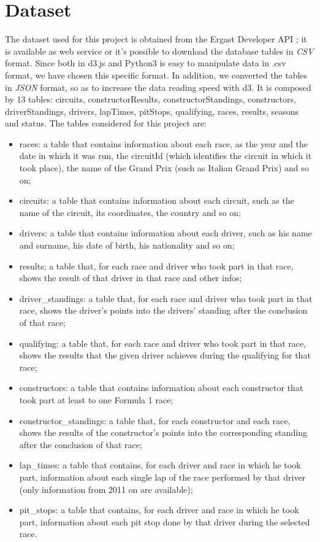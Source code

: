 \documentclass[11pt,twocolumn,letterpaper]{article}
\begin{document}
\section{Dataset}
The dataset used for this project is obtained from the Ergast Developer API \cite{Dataset}; it is available as web service or it's possible to download the database tables in \textit{CSV} format. Since both in d3.js \cite{D3} and Python3 is easy to manipulate data in .csv format, we have chosen this specific format. In addition, we converted the tables in \textit{JSON} format, so as to increase the data reading speed with d3. It is composed by 13 tables: circuits, constructorResults, constructorStandings, constructors, driverStandings, drivers, lapTimes, pitStops, qualifying, races, results, seasons and status. The tables considered for this project are:
\begin{itemize}
	\item races: a table that contains information about each race, as the year and the date in which it was run, the circuitId (which identifies the circuit in which it took place), the name of the Grand Prix (such as Italian Grand Prix) and so on;
	\item circuits: a table that contains information about each circuit, such as the name of the circuit, its coordinates, the country and so on;
	\item drivers: a table that contains information about each driver, such as his name and surname, his date of birth, his nationality and so on;
	\item results; a table that, for each race and driver who took part in that race, shows the result of that driver in that race and other infos;
	\item driver\_standings: a table that, for each race and driver who took part in that race, shows the driver's points into the drivers' standing after the conclusion of that race;
	\item qualifying: a table that, for each race and driver who took part in that race, shows the results that the given driver achieves during the qualifying for that race;
	\item constructors: a table that contains information about each constructor that took part at least to one Formula 1 race;
	\item constructor\_standings: a table that, for each constructor and each race, shows the results of the constructor's points into the corresponding standing after the conclusion of that race;
	\item lap\_times: a table that contains, for each driver and race in which he took part, information about each single lap of the race performed by that driver (only information from 2011 on are available);
	\item pit\_stops: a table that contains, for each driver and race in which he took part, information about each pit stop done by that driver during the selected race.
\end{itemize}
\end{document}
